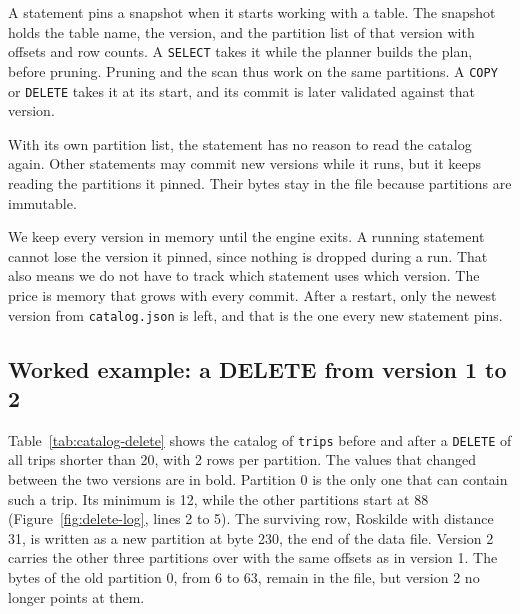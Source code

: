 \documentclass[11pt,a4paper,twocolumn]{article}
\begin{document}
A statement pins a snapshot when it starts working with a table. The snapshot holds the table name, the version, and the partition list of that version with offsets and row counts. A \texttt{SELECT} takes it while the planner builds the plan, before pruning. Pruning and the scan thus work on the same partitions. A \texttt{COPY} or \texttt{DELETE} takes it at its start, and its commit is later validated against that version.

With its own partition list, the statement has no reason to read the catalog again. Other statements may commit new versions while it runs, but it keeps reading the partitions it pinned. Their bytes stay in the file because partitions are immutable.

We keep every version in memory until the engine exits. A running statement cannot lose the version it pinned, since nothing is dropped during a run. That also means we do not have to track which statement uses which version. The price is memory that grows with every commit. After a restart, only the newest version from \texttt{catalog.json} is left, and that is the one every new statement pins.

\subsection{Worked example: a DELETE from version 1 to 2}

Table~\ref{tab:catalog-delete} shows the catalog of \texttt{trips} before and after a \texttt{DELETE} of all trips shorter than 20, with 2 rows per partition. The values that changed between the two versions are in bold. Partition 0 is the only one that can contain such a trip. Its minimum is 12, while the other partitions start at 88 (Figure~\ref{fig:delete-log}, lines 2 to 5). The surviving row, Roskilde with distance 31, is written as a new partition at byte 230, the end of the data file. Version 2 carries the other three partitions over with the same offsets as in version 1. The bytes of the old partition 0, from 6 to 63, remain in the file, but version 2 no longer points at them.
\end{document}

